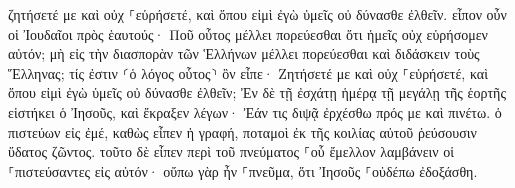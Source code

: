\documentclass{openreader}
\begin{document}
ζητήσετέ με καὶ οὐχ ⸀εὑρήσετέ, καὶ ὅπου εἰμὶ ἐγὼ ὑμεῖς οὐ δύνασθε ἐλθεῖν. 
εἶπον οὖν οἱ Ἰουδαῖοι πρὸς ἑαυτούς· Ποῦ οὗτος μέλλει πορεύεσθαι ὅτι ἡμεῖς οὐχ εὑρήσομεν αὐτόν; μὴ εἰς τὴν διασπορὰν τῶν Ἑλλήνων μέλλει πορεύεσθαι καὶ διδάσκειν τοὺς Ἕλληνας; 
τίς ἐστιν ⸂ὁ λόγος οὗτος⸃ ὃν εἶπε· Ζητήσετέ με καὶ οὐχ ⸀εὑρήσετέ, καὶ ὅπου εἰμὶ ἐγὼ ὑμεῖς οὐ δύνασθε ἐλθεῖν; 
Ἐν δὲ τῇ ἐσχάτῃ ἡμέρᾳ τῇ μεγάλῃ τῆς ἑορτῆς εἱστήκει ὁ Ἰησοῦς, καὶ ἔκραξεν λέγων· Ἐάν τις διψᾷ ἐρχέσθω πρός με καὶ πινέτω. 
ὁ πιστεύων εἰς ἐμέ, καθὼς εἶπεν ἡ γραφή, ποταμοὶ ἐκ τῆς κοιλίας αὐτοῦ ῥεύσουσιν ὕδατος ζῶντος. 
τοῦτο δὲ εἶπεν περὶ τοῦ πνεύματος ⸀οὗ ἔμελλον λαμβάνειν οἱ ⸀πιστεύσαντες εἰς αὐτόν· οὔπω γὰρ ἦν ⸀πνεῦμα, ὅτι Ἰησοῦς ⸀οὐδέπω ἐδοξάσθη. 
\end{document}
